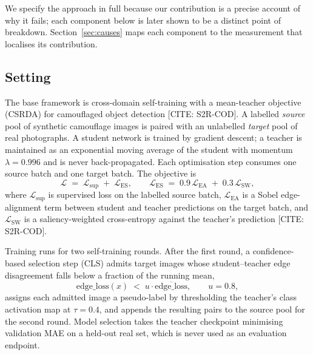 \documentclass{article}
\begin{document}
We specify the approach in full because our contribution is a precise account of
why it fails; each component below is later shown to be a distinct point of
breakdown. Section~\ref{sec:causes} maps each component to the measurement that
localises its contribution.

\subsection{Setting}

The base framework is cross-domain self-training with a mean-teacher objective
(CSRDA) for camouflaged object detection [CITE: S2R-COD]. A labelled
\emph{source} pool of synthetic camouflage images is paired with an unlabelled
\emph{target} pool of real photographs. A student network is trained by gradient
descent; a teacher is maintained as an exponential moving average of the student
with momentum $\lambda = 0.996$ and is never back-propagated.
Each optimisation step consumes one source batch and one target batch. The
objective is
\begin{equation}
\mathcal{L} \;=\; \mathcal{L}_{\mathrm{sup}} \;+\; \mathcal{L}_{\mathrm{ES}},
\qquad
\mathcal{L}_{\mathrm{ES}} \;=\; 0.9\,\mathcal{L}_{\mathrm{EA}} \;+\;
0.3\,\mathcal{L}_{\mathrm{SW}},
\label{eq:loss}
\end{equation}
where $\mathcal{L}_{\mathrm{sup}}$ is supervised loss on the labelled source
batch, $\mathcal{L}_{\mathrm{EA}}$ is a Sobel edge-alignment term between student
and teacher predictions on the target batch, and $\mathcal{L}_{\mathrm{SW}}$ is a
saliency-weighted cross-entropy against the teacher's prediction
[CITE: S2R-COD].

Training runs for two self-training rounds. After the first round, a
confidence-based selection step (CLS) admits target images whose
student--teacher edge disagreement falls below a fraction of the running mean,
\begin{equation}
\mathrm{edge\_loss}(x) \;<\; u \cdot \overline{\mathrm{edge\_loss}},
\qquad u = 0.8,
\label{eq:cls}
\end{equation}
assigns each admitted image a pseudo-label by thresholding the teacher's class
activation map at $\tau = 0.4$, and appends the resulting pairs to the source
pool for the second round.
Model selection takes the teacher checkpoint minimising validation MAE on a
held-out real set, which is never used as an evaluation endpoint.
\end{document}
